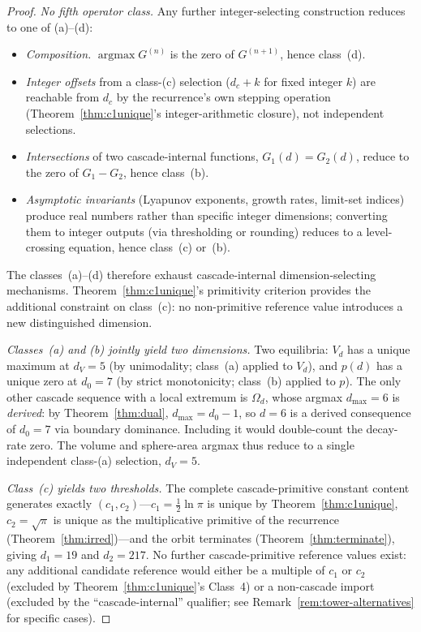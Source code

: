 \documentclass[11pt,a4paper]{article}
\begin{document}
\begin{proof}
\emph{No fifth operator class.} Any further integer-selecting
construction reduces to one of (a)--(d):
\begin{itemize}
\item \emph{Composition.} $\operatorname{argmax} G^{(n)}$ is the zero
of $G^{(n+1)}$, hence class~(d).
\item \emph{Integer offsets} from a class-(c) selection ($d_c + k$ for
fixed integer $k$) are reachable from $d_c$ by the recurrence's own
stepping operation (Theorem~\ref{thm:c1unique}'s integer-arithmetic
closure), not independent selections.
\item \emph{Intersections} of two cascade-internal functions, $G_1(d) =
G_2(d)$, reduce to the zero of $G_1 - G_2$, hence class~(b).
\item \emph{Asymptotic invariants} (Lyapunov exponents, growth rates,
limit-set indices) produce real numbers rather than specific integer
dimensions; converting them to integer outputs (via thresholding or
rounding) reduces to a level-crossing equation, hence class~(c) or~(b).
\end{itemize}
The classes~(a)--(d) therefore exhaust cascade-internal
dimension-selecting mechanisms. Theorem~\ref{thm:c1unique}'s
primitivity criterion provides the additional constraint on class~(c):
no non-primitive reference value introduces a new distinguished
dimension.

\emph{Classes~(a) and (b) jointly yield two dimensions.}
Two equilibria: $V_d$ has a unique maximum at $d_V = 5$ (by unimodality;
class~(a) applied to $V_d$), and $p(d)$ has a unique zero at $d_0 = 7$
(by strict monotonicity; class~(b) applied to $p$). The only other
cascade sequence with a local extremum is $\Omega_d$, whose argmax
$d_{\max} = 6$ is \emph{derived}: by Theorem~\ref{thm:dual},
$d_{\max} = d_0 - 1$, so $d = 6$ is a derived consequence of $d_0 = 7$
via boundary dominance. Including it would double-count the decay-rate
zero. The volume and sphere-area arg\-max thus reduce to a single
independent class-(a) selection, $d_V = 5$.

\emph{Class~(c) yields two thresholds.}
The complete cascade-primitive constant content generates exactly
$(c_1, c_2)$---$c_1 = \tfrac{1}{2}\ln\pi$ is unique by
Theorem~\ref{thm:c1unique}, $c_2 = \sqrt{\pi}$ is unique as the
multiplicative primitive of the recurrence
(Theorem~\ref{thm:irred})---and the orbit terminates
(Theorem~\ref{thm:terminate}), giving $d_1 = 19$ and $d_2 = 217$. No
further cascade-primitive reference values exist: any additional
candidate reference would either be a multiple of $c_1$ or $c_2$
(excluded by Theorem~\ref{thm:c1unique}'s Class~4) or a non-cascade
import (excluded by the ``cascade-internal'' qualifier; see
Remark~\ref{rem:tower-alternatives} for specific cases).


\end{proof}
\end{document}
